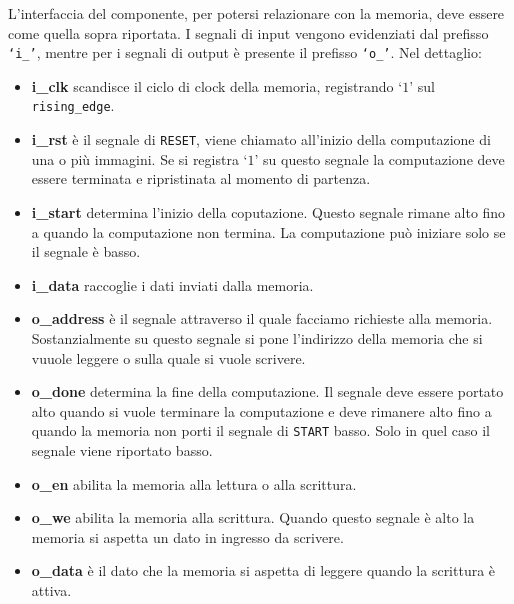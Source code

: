 \documentclass[11pt, a4paper]{article}
\begin{document}
L'interfaccia del componente, per potersi relazionare con la memoria, deve essere come quella sopra riportata. I segnali di input vengono evidenziati dal prefisso \texttt{\lq i\_'}, mentre per i segnali di output è presente il prefisso \texttt{\lq o\_'}. Nel dettaglio:
\begin{itemize}
  \item \textbf{i\_clk} scandisce il ciclo di clock della memoria, registrando \lq$1$' sul \texttt{rising\_edge}.
  \item \textbf{i\_rst} è il segnale di \texttt{RESET}, viene chiamato all'inizio della computazione di una o più immagini. Se si registra \lq$1$' su questo segnale la computazione deve essere terminata e ripristinata al momento di partenza.
  \item \textbf{i\_start} determina l'inizio della coputazione. Questo segnale rimane alto fino a quando la computazione non termina. La computazione può iniziare solo se il segnale è basso.
  \item \textbf{i\_data} raccoglie i dati inviati dalla memoria.
  \item \textbf{o\_address} è il segnale attraverso il quale facciamo richieste alla memoria. Sostanzialmente su questo segnale si pone l'indirizzo della memoria che si vuuole leggere o sulla quale si vuole scrivere.
  \item \textbf{o\_done} determina la fine della computazione. Il segnale deve essere portato alto quando si vuole terminare la computazione e deve rimanere alto fino a quando la memoria non porti il segnale di \texttt{START} basso. Solo in quel caso il segnale viene riportato basso.
  \item \textbf{o\_en} abilita la memoria alla lettura o alla scrittura.
  \item \textbf{o\_we}  abilita la memoria alla scrittura. Quando questo segnale è alto la memoria si aspetta un dato in ingresso da scrivere.
  \item \textbf{o\_data} è il dato che la memoria si aspetta di leggere quando la scrittura è attiva.
\end{itemize}
\pagebreak
\end{document}
